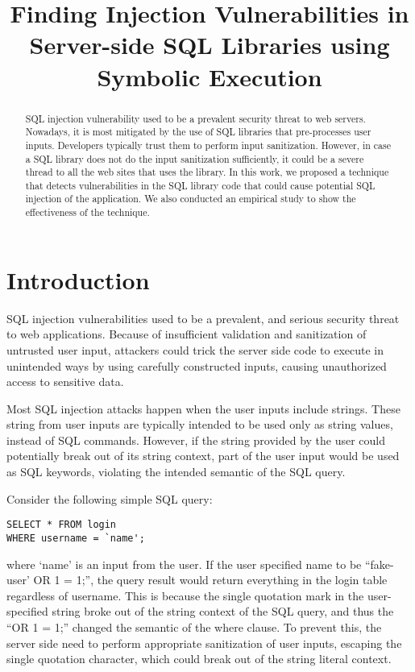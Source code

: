 \documentclass[conference]{IEEEtran}
\begin{document}
\title{Finding Injection Vulnerabilities in Server-side SQL Libraries using Symbolic Execution}

\author{
}

\maketitle

\begin{abstract}

SQL injection vulnerability used to be a prevalent security threat to web servers. Nowadays, it is most mitigated by the use of SQL libraries that pre-processes user inputs. Developers typically trust them to perform input sanitization. However, in case a SQL library does not do the input sanitization sufficiently, it could be a severe thread to all the web sites that uses the library. In this work, we proposed a technique that detects vulnerabilities in the SQL library code that could cause potential SQL injection of the application. We also conducted an empirical study to show the effectiveness of the technique.

\end{abstract}

\IEEEpeerreviewmaketitle

\section{Introduction}
\label{introduction}

SQL injection vulnerabilities used to be a prevalent, and serious security threat to web applications. Because of insufficient validation and sanitization of untrusted user input, attackers could trick the server side code to execute in unintended ways by using carefully constructed inputs, causing unauthorized access to sensitive data.

Most SQL injection attacks happen when the user inputs include strings. These string from user inputs are typically intended to be used only as string values, instead of SQL commands. However, if the string provided by the user could potentially break out of its string context, part of the user input would be used as SQL keywords, violating the intended semantic of the SQL query. 

Consider the following simple SQL query:
\begin{lstlisting}[breaklines=true]
SELECT * FROM login 
WHERE username = `name';
\end{lstlisting}
where `name' is an input from the user.
If the user specified name to be ``fake-user' OR 1 = 1;'', the query result would return everything in the login table regardless of username. This is because the single quotation mark in the user-specified string broke out of the string context of the SQL query, and thus the ``OR 1 = 1;'' changed the semantic of the where clause.
To prevent this, the server side need to perform appropriate sanitization of user inputs, escaping the single quotation character, which could break out of the string literal context.
\end{document}
